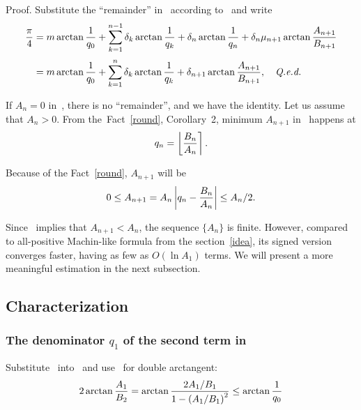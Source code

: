 \documentclass[draft, 10pt]{article} %
\def\fact#1{Fact~\ref{#1}}
\begin{document}
Proof. Substitute the ``remainder'' in~
according to~ and write
$$
\begin{array}{ll}
\dfrac{\pi}{4} = m \arctan\dfrac{1}{q_0}
    + \sum_{k=1}^{n-1} \delta_k \arctan\dfrac{1}{q_k}
    + \delta_n \arctan\dfrac{1}{q_n}
    + \delta_n \mu_{n+1} \arctan\dfrac{A_{n+1}}{B_{n+1}} \\[16pt]
\phantom{\dfrac{\pi}{4}} = m \arctan\dfrac{1}{q_0}
    + \sum_{k=1}^n \delta_k \arctan\dfrac{1}{q_k}
    + \delta_{n+1} \arctan\dfrac{A_{n+1}}{B_{n+1}}, \quad\hbox{\qed}
\end{array}
$$

If $A_n = 0$ in~, there is no ``remainder'', and we have the
identity. Let us assume that $A_n > 0$.
From the~\fact{round}, Corollary~2, minimum $A_{n+1}$ in~
happens at
%
\begin{equation}\mlabel{q-next}
q_n = \nround{\dfrac{B_n}{A_n}}.
\end{equation}

Because of the \fact{round}, $A_{n+1}$ will be
%
\begin{equation}\mlabel{decay-a}
0 \le A_{n+1} = A_n \absolute{q_n - \dfrac{B_n}{A_n}} \le A_n / 2.
\end{equation}

Since~ implies that $A_{n+1} < A_n$, the sequence $\{ A_n \}$ is finite.
However, compared to all-positive Machin-like formula from the section~\ref{idea},
its signed version~ converges faster, having as few as
$O(\ln A_1)$ terms. We will present a more meaningful estimation in the next
subsection.

\subsection{Characterization}

\subsubsection{The denominator $q_1$ of the second term in~}

Substitute~ into~ and use~
for double arctangent:
%
\begin{equation}\mlabel{compare-two-terms}
2\arctan \dfrac{A_1}{B_2} = \arctan \dfrac{2A_1/B_1}{1-\left(A_1/B_1\right)^2} \le \arctan \dfrac{1}{q_0}
\end{equation}
\end{document}
